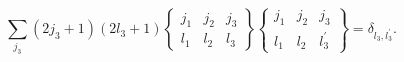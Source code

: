\[\sum_{j_{3}}(2j_{3}+1)(2l_{3}+1)\begin{Bmatrix}j_{1}&j_{2}&j_{3}\\
l_{1}&l_{2}&l_{3}\end{Bmatrix}\begin{Bmatrix}j_{1}&j_{2}&j_{3}\\
l_{1}&l_{2}&l^{\prime}_{3}\end{Bmatrix}=\delta_{l_{3},l^{\prime}_{3}}.\]